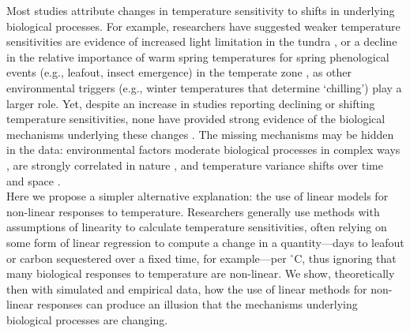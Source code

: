 \documentclass[11pt,letter]{article}
\newcommand{\R}[1]{\label{#1}\linelabel{#1}}
\begin{document}
Most studies attribute changes in temperature sensitivity to shifts in underlying biological processes. For example, researchers have suggested weaker temperature sensitivities are evidence of increased light limitation in the tundra \citep{piao2017}, or a decline in the relative importance of warm spring temperatures for spring phenological events (e.g., leafout, insect emergence) in the temperate zone \citep{fu2015,meng2020}, as other environmental triggers (e.g., winter temperatures that determine `chilling') play a larger role. Yet, despite an increase in studies reporting declining or shifting temperature sensitivities, none have provided strong evidence of the biological mechanisms underlying these changes  \citep[e.g.,][]{fu2015,meng2020}. The missing mechanisms may be hidden in the data: environmental factors moderate biological processes in complex ways \citep{chuine2016,gusewell2017}, are strongly correlated in nature \citep[e.g.,][]{fu2015}, and temperature variance shifts over time and space \citep{keenan2019}. \\

Here we propose a simpler alternative explanation: the use of linear models for non-linear responses to temperature. Researchers generally use methods with assumptions of linearity to calculate temperature sensitivities, often relying on some form of linear regression to compute a change in a quantity---days to leafout or carbon sequestered over a fixed time, for example---per $^{\circ}$C, thus ignoring that many biological responses to temperature are non-linear. We show, theoretically then with simulated and empirical data, how the use of linear methods for non-linear responses\R{semantic1} can produce an illusion that the mechanisms underlying biological processes are changing.\\ %
\end{document}
